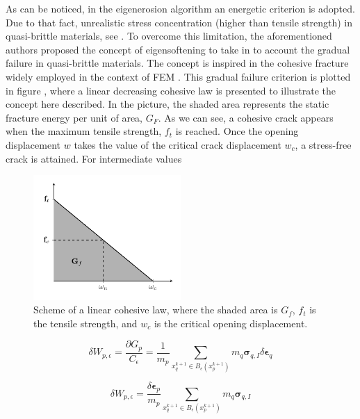 \documentclass[preprint,12pt,a4paper]{elsarticle}
\newcommand{\tens}[1]{
  \ensuremath{\mathbf{{#1}}}
}
\begin{document}
As can be noticed, in the eigenerosion algorithm an energetic
criterion is adopted. Due to that fact, unrealistic stress
concentration (higher than tensile strength) in quasi-brittle materials, see
\cite{Navas_2017_ES}. To overcome this limitation, the aforementioned
authors proposed the concept of eigensoftening to take in to account
the gradual failure in quasi-brittle materials. The concept is
inspired in the cohesive fracture widely employed in the context of
FEM \cite{Ortiz_1999}. This gradual failure criterion is plotted in
figure \label{fig:Damage-ft-wc}, where a linear decreasing cohesive
law is presented to illustrate the concept here described. In the
picture, the shaded area represents the static fracture energy per
unit of area, $G_F$. As we can see, a cohesive crack appears when the
maximum tensile strength, $f_t$ is reached. Once the opening
displacement $w$ takes the value of the critical crack displacement
$w_c$, a stress-free crack is attained. For intermediate values 
\begin{figure}
  \centering
  \includegraphics[width=0.5\textwidth]{Figures/Damage}
  \caption{Scheme of a linear cohesive law, where the shaded area is
    $G_f$, $f_t$ is the tensile strength, and $w_c$ is the critical
    opening displacement.}
  \label{fig:Damage-ft-wc}
\end{figure}


\begin{equation}
  \label{eq:variation-averaged-strain-energy-density}
  \delta W_{p,\epsilon} = \frac{\partial G_p}{C_{\epsilon}} =
  \frac{1}{m_p} \sum_{x_q^{k+1} \in
  B_{\epsilon}(x_p^{k+1})} m_q \tens{\sigma}_{q,I} \delta \tens{\epsilon}_q
\end{equation}

\begin{equation}
  \label{eq:variation-averaged-strain-energy-density-simpli}
  \delta W_{p,\epsilon} =
  \frac{\delta \tens{\epsilon}_p}{m_p} \sum_{x_q^{k+1} \in
  B_{\epsilon}(x_p^{k+1})} m_q \tens{\sigma}_{q,I} 
\end{equation}
\end{document}
